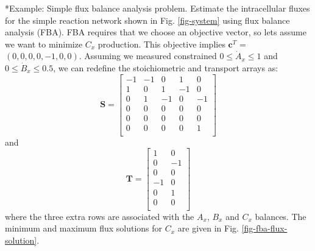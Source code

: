 \documentclass[11pt]{article}
\makeatletter
\theoremstyle{definition}
\renewcommand\subsubsection{\@startsection
	{subsubsection}{2}{0mm}
	{-0.05in}
	{-0.5\baselineskip}
	{\normalfont\normalsize\itshape}}
\makeatother
\begin{document}
\subsubsection*{Example: Simple flux balance analysis problem.}
	Estimate the intracellular fluxes for the simple reaction network shown in Fig. \eqref{fig-system} using flux balance analysis (FBA).
	FBA requires that we choose an objective vector, so lets assume we want to
	minimize $C_{x}$ production. This objective implies $\mathbf{c}^{T}$ = $\left(0,0,0,0,-1,0,0\right)$.
	Assuming we measured constrained $0\leq\dot{A}_{x}\leq{1}$ and $0\leq\dot{B}_{x}\leq{0.5}$,  we can redefine the stoichiometric and transport arrays as:
	\begin{equation}
	\mathbf{S} =
	\begin{bmatrix}
		-1 & -1 & 0 & 1 & 0 \\
		1 & 0 & 1 & -1 & 0 \\
		0 & 1 & -1 & 0 & -1 \\
		0 & 0 & 0 & 0 & 0 \\
		0 & 0 & 0 & 0 & 0 \\
		0 & 0 & 0 & 0 & 1 \\
	\end{bmatrix}
	\end{equation} and
	\begin{equation}
		\mathbf{T} =
		\begin{bmatrix}
			1 & 0 \\
			0 & -1 \\
			0 & 0 \\
			-1 & 0 \\
			0 & 1 \\
			0 & 0 \\
		\end{bmatrix}
	\end{equation}where the three extra rows are associated with the $A_{x}$, $B_{x}$ and $C_{x}$ balances.
	The minimum and maximum flux solutions for $C_{x}$ are given in Fig. \eqref{fig-fba-flux-solution}.
\end{document}
